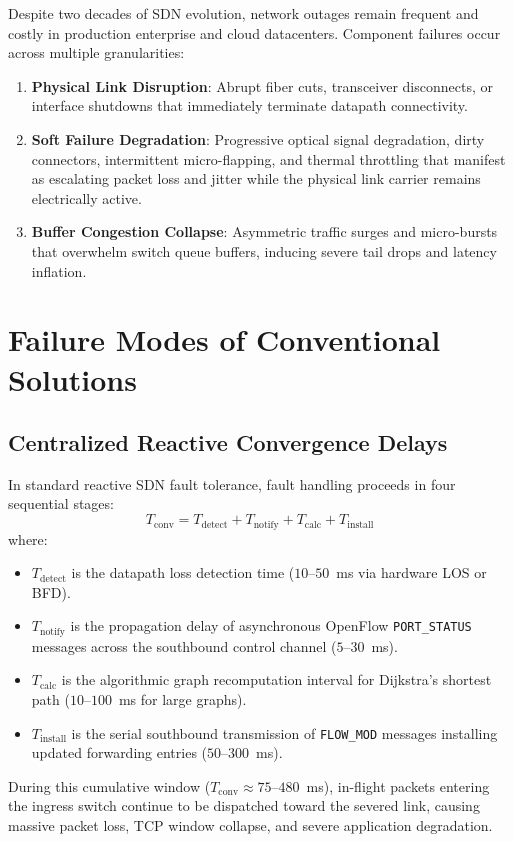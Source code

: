 \documentclass[11pt,a4paper]{report}
\begin{document}
Despite two decades of SDN evolution, network outages remain frequent and costly in production enterprise and cloud datacenters. Component failures occur across multiple granularities:
\begin{enumerate}
    \item \textbf{Physical Link Disruption}: Abrupt fiber cuts, transceiver disconnects, or interface shutdowns that immediately terminate datapath connectivity.
    \item \textbf{Soft Failure Degradation}: Progressive optical signal degradation, dirty connectors, intermittent micro-flapping, and thermal throttling that manifest as escalating packet loss and jitter while the physical link carrier remains electrically active.
    \item \textbf{Buffer Congestion Collapse}: Asymmetric traffic surges and micro-bursts that overwhelm switch queue buffers, inducing severe tail drops and latency inflation.
\end{enumerate}

\section{Failure Modes of Conventional Solutions}

\subsection{Centralized Reactive Convergence Delays}
In standard reactive SDN fault tolerance, fault handling proceeds in four sequential stages:
\begin{equation}
T_{\text{conv}} = T_{\text{detect}} + T_{\text{notify}} + T_{\text{calc}} + T_{\text{install}}
\end{equation}
where:
\begin{itemize}
    \item $T_{\text{detect}}$ is the datapath loss detection time ($10$--$50$~ms via hardware LOS or BFD).
    \item $T_{\text{notify}}$ is the propagation delay of asynchronous OpenFlow \texttt{PORT\_STATUS} messages across the southbound control channel ($5$--$30$~ms).
    \item $T_{\text{calc}}$ is the algorithmic graph recomputation interval for Dijkstra's shortest path ($10$--$100$~ms for large graphs).
    \item $T_{\text{install}}$ is the serial southbound transmission of \texttt{FLOW\_MOD} messages installing updated forwarding entries ($50$--$300$~ms).
\end{itemize}
During this cumulative window ($T_{\text{conv}} \approx 75$--$480$~ms), in-flight packets entering the ingress switch continue to be dispatched toward the severed link, causing massive packet loss, TCP window collapse, and severe application degradation.
\end{document}
